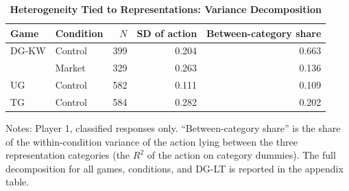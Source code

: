 \begin{table}[!htbp]
\centering
\small
\renewcommand{\arraystretch}{1.15}
\caption{\textbf{Heterogeneity Tied to Representations: Variance Decomposition}}
\label{tab:heterogeneity_decomposition_main}
\begin{tabular}{ll rrr}
\toprule
Game & Condition & $N$ & SD of action & Between-category share \\
\midrule
DG-KW & Control & 399 & 0.204 & 0.663 \\
 & Market & 329 & 0.263 & 0.136 \\
UG & Control & 582 & 0.111 & 0.109 \\
TG & Control & 584 & 0.282 & 0.202 \\
\bottomrule
\end{tabular}
\begin{flushleft}
\footnotesize Notes: Player 1, classified responses only. ``Between-category share'' is the share of the within-condition variance of the action lying between the three representation categories (the $R^2$ of the action on category dummies). The full decomposition for all games, conditions, and DG-LT is reported in the appendix table.
\end{flushleft}
\end{table}
